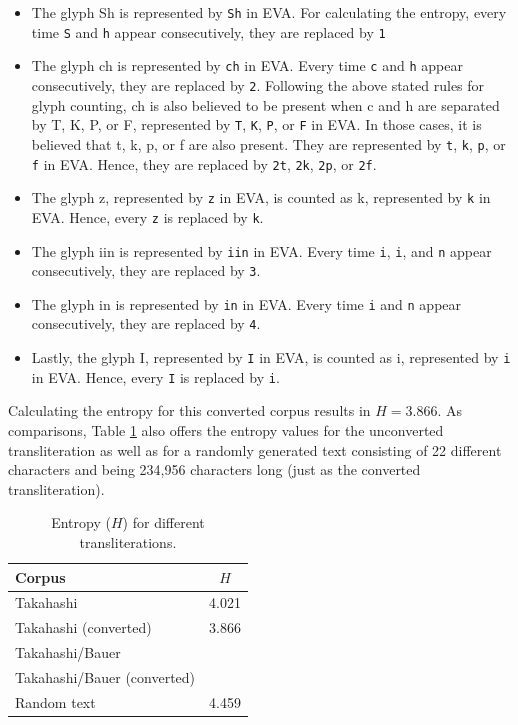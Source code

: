 \documentclass{scrarticle}
\begin{document}
\begin{itemize}
   \item The glyph {\eva Sh} is represented by \texttt{Sh} in EVA. For calculating the entropy, every time \texttt{S} and \texttt{h} appear consecutively, they are replaced by \texttt{1}
   \item The glyph {\eva ch} is represented by \texttt{ch} in EVA. Every time \texttt{c} and \texttt{h} appear consecutively, they are replaced by \texttt{2}. Following the above stated rules for glyph counting, {\eva ch} is also believed to be present when {\eva c} and {\eva h} are separated by {\eva T}, {\eva K}, {\eva P}, or {\eva F}, represented by \texttt{T}, \texttt{K}, \texttt{P}, or \texttt{F} in EVA. In those cases, it is believed that {\eva t}, {\eva k}, {\eva p}, or {\eva f} are also present. They are represented by \texttt{t}, \texttt{k}, \texttt{p}, or \texttt{f}  in EVA. Hence, they are replaced by \texttt{2t}, \texttt{2k}, \texttt{2p}, or \texttt{2f}.
   \item The glyph {\eva z}, represented by \texttt{z} in EVA, is counted as {\eva k}, represented by \texttt{k} in EVA. Hence, every \texttt{z} is replaced by \texttt{k}.
   \item The glyph {\eva iin} is represented by \texttt{iin} in EVA. Every time \texttt{i}, \texttt{i}, and \texttt{n} appear consecutively, they are replaced by \texttt{3}.   
   \item The glyph {\eva in} is represented by \texttt{in} in EVA. Every time \texttt{i} and \texttt{n} appear consecutively, they are replaced by \texttt{4}.
   \item Lastly, the glyph {\eva I}, represented by \texttt{I} in EVA, is counted as {\eva i}, represented by \texttt{i} in EVA. Hence, every \texttt{I} is replaced by \texttt{i}.
\end{itemize}

\noindent Calculating the entropy for this converted corpus results in $H=3.866$.
As comparisons, Table \ref{tab:entropy} also offers the entropy values for the unconverted transliteration as well as for a randomly generated text consisting of 22 different characters and being 234,956 characters long (just as the converted transliteration).

\begin{table}[ht]
\center
\begin{tabular}{lr}
   \hline
   Corpus                        & \multicolumn{1}{c}{$H$}   \\
   \hline\hline
   Takahashi                     & 4.021                     \\
   Takahashi (converted)         & 3.866                     \\
   Takahashi/Bauer               &                           \\
   Takahashi/Bauer (converted)   &                           \\
   Random text                   & 4.459                     \\
   \hline
\end{tabular}
\caption{Entropy ($H$) for different transliterations.}
\label{tab:entropy}
\end{table}


\clearpage
\printbibliography
\end{document}
